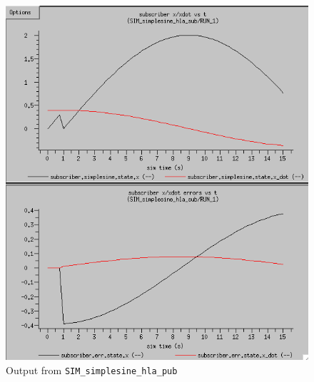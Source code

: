 \begin{figure}[b]
  \begin{center}
    \includegraphics[width=4.5in]{TrickHLAUser-SIM-hla-sub.png}
  \end{center}
\caption{Output from {\tt SIM\_simplesine\_hla\_pub}}
\label{fig:hla-sub-output}
\end{figure}


